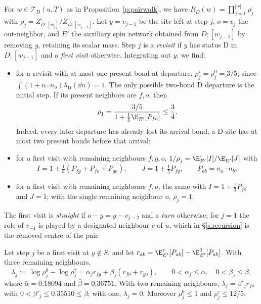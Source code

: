 For $w\in\mathcal T_D(u,T)$ as in Proposition~\ref{p:pairwalk}, we have
$R^\cdot_D(w)=\prod_{j=1}^{|w|}\rho^\cdot_j$ with
$\rho^\cdot_j=Z^\cdot_{D;[w_j]}/Z^\cdot_{D;[w_{j-1}]}$.
Let $y=v_{j-1}$ be the site left at step $j$, $o=v_j$ the
out-neighbor, and $E'$ the auxiliary spin network obtained from
$D;[w_{j-1}]$ by removing $y$, retaining its scalar mass. Step $j$ is
a \emph{revisit} if $y$ has status $\mathrm D$ in $D;[w_{j-1}]$ and
a \emph{first visit} otherwise. Integrating out $y$, we find:
\begin{itemize}
\item for a revisit with at most one present bond at departure,
$\rho^\tau_j=\rho^0_j=3/5$, since
$\int(1+n\cdot n_o)\lambda_{\mathrm D}(\dd n)=1$.
The only possible two-bond $\mathrm D$ departure is the initial step.
If its present neighbors are $f,o$, then
\[
\rho^\cdot_1=
\frac{3/5}{1+\frac15\E^\cdot_{E'}[P_{fo}]}\le\frac34.
\]
Indeed, every later departure has already lost its arrival bond;
a $\mathrm D$ site has at most two present bonds before that arrival;
\item for a first visit with remaining neighbours $f, g, o$, $1/\rho^\cdot_j = \E^\cdot_{E'}[I] / \E^\cdot_{E'}[J]$ with
\begin{equation}\label{e:IJ}
I = 1 + \tfrac13 (P_{fg} + P_{fo} + P_{go}), \qquad J = 1 + \tfrac15 P_{fg}, \qquad P_{ab} = n_a \cdot n_b ;
\end{equation}
\item for a first visit with remaining neighbours $f, o$, the same with $I = 1 + \frac13 P_{fo}$ and $J = 1$; with the single remaining neighbour $o$, $\rho^\cdot_j = 1$.
\end{itemize}
The first visit is \emph{straight} if $o - y = y - v_{j - 2}$ and a \emph{turn} otherwise; for $j = 1$ the role of $v_{-1}$ is played by a designated neighbour $c$ of $u$, which in \S\ref{s:recursion} is the removed centre of the pair.

\begin{lemma}\label{l:response}
Let step $j$ be a first visit at $y \notin S$, and let $r_{ab} = \E^\tau_{E'}[P_{ab}] - \E^0_{E'}[P_{ab}]$. With three remaining neighbours,
\begin{equation}\label{e:lambda}
\lambda_j := \log \rho^0_j - \log \rho^\tau_j = \alpha_j r_{fg} + \beta_j (r_{fo} + r_{go}), \qquad 0 < \alpha_j \le \bar\alpha, \quad 0 < \beta_j \le \bar\beta,
\end{equation}
where $\bar \alpha = 0.18094$ and $\bar \beta = 0.36751$. With two remaining neighbours, $\lambda_j = \beta'_j r_{fo}$ with $0 < \beta'_j \le 0.35510 \le \bar\beta$; with one, $\lambda_j = 0$. Moreover $\rho^0_j \le 1$ and $\rho^\tau_j \le 12/5$.
\end{lemma}

